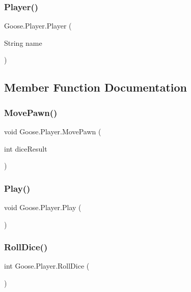 \subsubsection{\texorpdfstring{Player()}{Player()}}
{\footnotesize\ttfamily Goose.\+Player.\+Player (\begin{DoxyParamCaption}\item[{String}]{name }\end{DoxyParamCaption})}



\subsection{Member Function Documentation}
\mbox{\label{class_goose_1_1_player_a187622a1a4433fa733ce7b4ae3b1896c}} 
\subsubsection{\texorpdfstring{Move\+Pawn()}{MovePawn()}}
{\footnotesize\ttfamily void Goose.\+Player.\+Move\+Pawn (\begin{DoxyParamCaption}\item[{int}]{dice\+Result }\end{DoxyParamCaption})}

\mbox{\label{class_goose_1_1_player_a52a22592e93b051ee7ad9a9bf0943705}} 
\subsubsection{\texorpdfstring{Play()}{Play()}}
{\footnotesize\ttfamily void Goose.\+Player.\+Play (\begin{DoxyParamCaption}{ }\end{DoxyParamCaption})}

\mbox{\label{class_goose_1_1_player_ab5055d50f4965ecf76e14372f5ff3d61}} 
\subsubsection{\texorpdfstring{Roll\+Dice()}{RollDice()}}
{\footnotesize\ttfamily int Goose.\+Player.\+Roll\+Dice (\begin{DoxyParamCaption}{ }\end{DoxyParamCaption})}



